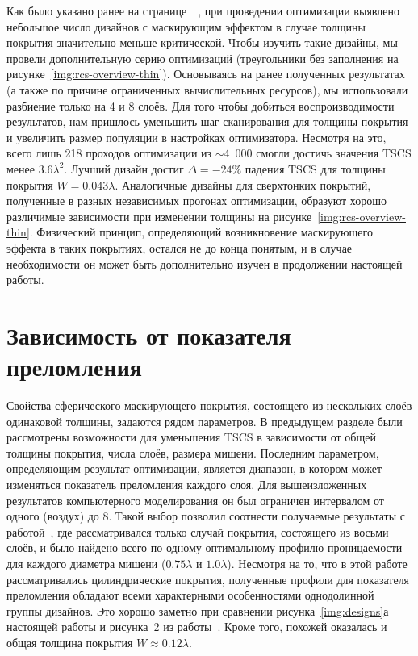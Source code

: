 Как было указано ранее на
странице~\pageref{backref:thin-designs}~\label{ref:thin-designs}, при
проведении оптимизации выявлено небольшое число дизайнов с
маскирующим эффектом в случае толщины покрытия значительно меньше
критической.  Чтобы изучить такие дизайны, мы провели дополнительную
серию оптимизаций (треугольники без заполнения на
рисунке~\ref{img:rcs-overview-thin}).  Основываясь на ранее полученных
результатах (а также по причине ограниченных вычислительных ресурсов),
мы использовали разбиение только на 4 и 8 слоёв.  Для того чтобы
добиться воспроизводимости результатов, нам пришлось уменьшить шаг
сканирования для толщины покрытия и увеличить размер популяции в
настройках оптимизатора.  Несмотря на это, всего лишь 218 проходов
оптимизации из $\sim$4~000 смогли достичь значения TSCS менее
$3.6\lambda^2$.  Лучший дизайн достиг $\Delta = -24\%$ падения TSCS для толщины
покрытия $W=0.043\lambda$.  Аналогичные дизайны для сверхтонких
покрытий, полученные в разных независимых прогонах оптимизации,
образуют хорошо различимые зависимости при изменении толщины на
рисунке~\ref{img:rcs-overview-thin}.  Физический принцип, определяющий
возникновение маскирующего эффекта в таких покрытиях, остался не до
конца понятым, и в случае необходимости он может быть дополнительно
изучен в продолжении настоящей работы.


\section{Зависимость от показателя преломления}

Свойства сферического маскирующего покрытия, состоящего из нескольких
слоёв одинаковой толщины, задаются рядом параметров. В предыдущем
разделе были рассмотрены возможности для уменьшения TSCS в зависимости
от общей толщины покрытия, числа слоёв, размера мишени. Последним
параметром, определяющим результат оптимизации, является диапазон, в
котором может изменяться показатель преломления каждого слоя.  Для
вышеизложенных результатов компьютерного моделирования он был
ограничен интервалом от одного (воздух) до $8$.  Такой выбор позволил
соотнести получаемые результаты с работой~\cite{semouchkina2}, где
рассматривался только случай покрытия, состоящего из восьми
слоёв, и было найдено всего по одному оптимальному профилю
проницаемости для каждого диаметра мишени ($0.75\lambda$ и
$1.0\lambda$). Несмотря на то, что в этой работе рассматривались
цилиндрические покрытия, полученные профили для показателя преломления
обладают всеми характерными особенностями однодолинной группы
дизайнов. Это хорошо заметно при сравнении
рисунка~\ref{img:designs}а настоящей работы и рисунка~2 из
работы~\cite{semouchkina2}. Кроме того, похожей оказалась и общая
толщина покрытия $W\approx 0.12\lambda$.

